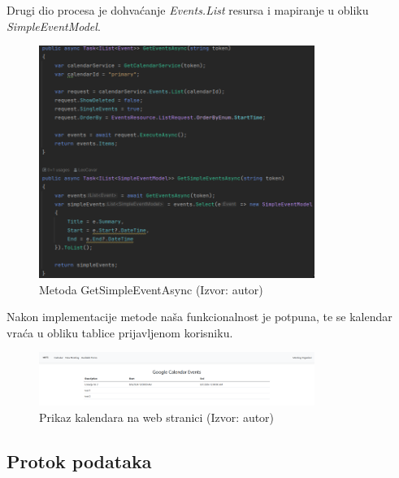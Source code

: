 \documentclass{foi}
\begin{document}
Drugi dio procesa je dohvaćanje \textit{Events.List} resursa i mapiranje u obliku \textit{SimpleEventModel}.
\begin{figure}[H]
    \centering
    \includegraphics[width=0.8\textwidth]{slike/GetSimpleEventAsync.png}
    \caption{Metoda GetSimpleEventAsync (Izvor: autor)}
    \label{fig:GetSimpleEventAsync}
\end{figure}
Nakon implementacije metode naša funkcionalnost je potpuna, te se kalendar vraća u obliku tablice prijavljenom korisniku.
\begin{figure}[H]
    \centering
    \includegraphics[width=0.8\textwidth]{slike/calendarEvents.png}
    \caption{Prikaz kalendara na web stranici (Izvor: autor)}
    \label{fig:CalendarViewImg}
\end{figure}
\subsection{Protok podataka}
\end{document}
